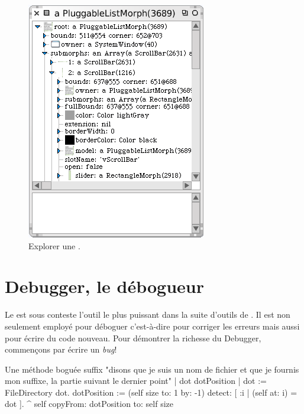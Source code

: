 \documentclass[a4paper,10pt,twoside]{book}
\begin{document}
\begin{figure}[tbp]
	\begin{center}
		\includegraphics[scale=0.7]{explorePluggableListMorph}
	\end{center}
	\caption{Explorer une .}
	\label{fig:explorePluggableListMorph}
\end{figure}

\section{Debugger, le d\'ebogueur}
\label{sec:debugger} %

Le   est sous conteste l'outil le plus
puissant dans la suite d'outils de \sq. 
Il est non seulement employ\'e pour d\'eboguer c'est-à-dire pour corriger les erreurs
mais aussi pour \'ecrire du code nouveau.
Pour d\'emontrer la richesse du Debugger, commen\c{c}ons par
\'ecrire un \emph{bug}!


\needspace{10ex}
\begin{method}[buggy]{Une m\'ethode bogu\'ee}
suffix
	"disons que je suis un nom de fichier et que je fournis mon suffixe, la partie suivant le dernier point"
	| dot dotPosition |
	dot := FileDirectory dot.
	dotPosition := (self size to: 1 by: -1) detect: [ :i | (self at: i) = dot ].
	^ self copyFrom: dotPosition to: self size 
\end{method}
\end{document}
